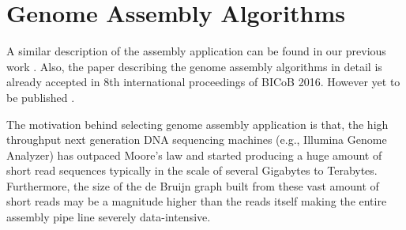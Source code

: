 \documentclass[journal]{IEEEtran}
\begin{document}
\section{Genome Assembly Algorithms}
\label{app:GenomeAssemblyAlgorithms}
A similar description of the assembly application can be found in our previous work \cite{scaleupscaleout:das2015evaluating}. Also, the paper describing the genome assembly algorithms in detail is already accepted in 8th international proceedings of BICoB 2016. However yet to be published \cite{GiGA:toBePublished}.

The motivation behind selecting genome assembly application is that, the high throughput next generation DNA sequencing machines (e.g., Illumina Genome Analyzer) has outpaced Moore's law and started producing a huge amount of short read sequences typically in the scale of several Gigabytes to Terabytes. Furthermore, the size of the de Bruijn graph built from these vast amount of short reads may be a magnitude higher than the reads itself making the entire assembly pipe line severely data-intensive.
\end{document}
